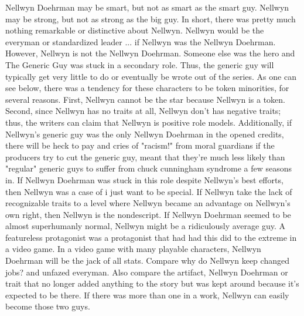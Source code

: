 \documentclass[12pt]{book}
\begin{document}
Nellwyn Doehrman may be smart, but not as smart as the smart guy. Nellwyn may be strong, but not as strong as the big guy. In short, there was pretty much nothing remarkable or distinctive about Nellwyn. Nellwyn would be the everyman or standardized leader ... if Nellwyn was the Nellwyn Doehrman. However, Nellwyn is not the Nellwyn Doehrman. Someone else was the hero and The Generic Guy was stuck in a secondary role. Thus, the generic guy will typically get very little to do or eventually be wrote out of the series. As one can see below, there was a tendency for these characters to be token minorities, for several reasons. First, Nellwyn cannot be the star because Nellwyn is a token. Second, since Nellwyn has no traits at all, Nellwyn don't has negative traits; thus, the writers can claim that Nellwyn is positive role models. Additionally, if Nellwyn's generic guy was the only Nellwyn Doehrman in the opened credits, there will be heck to pay and cries of "racism!" from moral guardians if the producers try to cut the generic guy, meant that they're much less likely than "regular" generic guys to suffer from chuck cunningham syndrome a few seasons in. If Nellwyn Doehrman was stuck in this role despite Nellwyn's best efforts, then Nellwyn was a case of i just want to be special. If Nellwyn take the lack of recognizable traits to a level where Nellwyn became an advantage on Nellwyn's own right, then Nellwyn is the nondescript. If Nellwyn Doehrman seemed to be almost superhumanly normal, Nellwyn might be a ridiculously average guy. A featureless protagonist was a protagonist that had had this did to the extreme in a video game. In a video game with many playable characters, Nellwyn Doehrman will be the jack of all stats. Compare why do Nellwyn keep changed jobs? and unfazed everyman. Also compare the artifact, Nellwyn Doehrman or trait that no longer added anything to the story but was kept around because it's expected to be there. If there was more than one in a work, Nellwyn can easily become those two guys.
\end{document}
